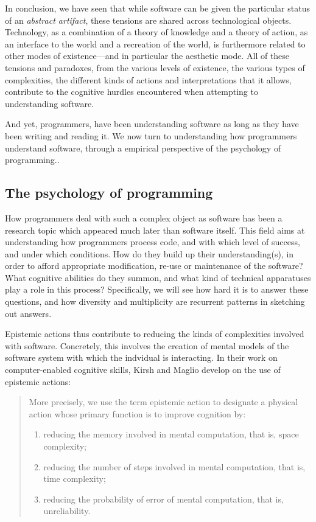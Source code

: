 \spacer

In conclusion, we have seen that while software can be given the particular status of an \emph{abstract artifact}, these tensions are shared across technological objects. Technology, as a combination of a theory of knowledge and a theory of action, as an interface to the world and a recreation of the world, is furthermore related to other modes of existence—and in particular the aesthetic mode. All of these tensions and paradoxes, from the various levels of existence, the various types of complexities, the different kinds of actions and interpretations that it allows, contribute to the cognitive hurdles encountered when attempting to understanding software.

And yet, programmers, have been understanding software as long as they have been writing and reading it. We now turn to understanding how programmers understand software, through a empirical perspective of the psychology of programming..

\subsection{The psychology of programming}
\label{subsec:psychology-programming}

How programmers deal with such a complex object as software has been a research topic which appeared much later than software itself. This field aims at understanding how programmers process code, and with which level of success, and under which conditions. How do they build up their understanding(s), in order to afford appropriate modification, re-use or maintenance of the software? What cognitive abilities do they summon, and what kind of technical apparatuses play a role in this process? Specifically, we will see how hard it is to answer these questions, and how diversity and multiplicity are recurrent patterns in sketching out answers.

Epistemic actions thus contribute to reducing the kinds of complexities involved with software. Concretely, this involves the creation of mental models of the software system with which the indvidual is interacting. In their work on computer-enabled cognitive skills, Kirsh and Maglio develop on the use of epistemic actions:

\begin{quote}
    More precisely, we use the term epistemic action to designate a physical action whose primary function is to improve cognition by:
    \begin{enumerate}
        \item{reducing the memory involved in mental computation, that is, space complexity;}
        \item{reducing the number of steps involved in mental computation, that is, time complexity;}
        \item{reducing the probability of error of mental computation, that is, unreliability.}
    \end{enumerate}
    \citep{kirsh_distinguishing_1994}
\end{quote}

